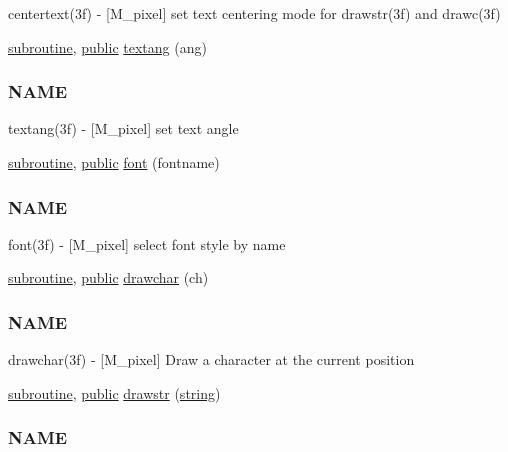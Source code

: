 \begin{DoxyCompactItemize}
\begin{DoxyCompactList}
centertext(3f) -\/ \mbox{[}M\+\_\+pixel\mbox{]} set text centering mode for drawstr(3f) and drawc(3f) \end{DoxyCompactList}\item 
\hyperlink{M__stopwatch_83_8txt_acfbcff50169d691ff02d4a123ed70482}{subroutine}, \hyperlink{M__stopwatch_83_8txt_a2f74811300c361e53b430611a7d1769f}{public} \hyperlink{namespacem__pixel_a5e213461e9894b99c9e8f278d5c4a858}{textang} (ang)
\begin{DoxyCompactList}\small\item\em \subsubsection*{N\+A\+ME}

textang(3f) -\/ \mbox{[}M\+\_\+pixel\mbox{]} set text angle \end{DoxyCompactList}\item 
\hyperlink{M__stopwatch_83_8txt_acfbcff50169d691ff02d4a123ed70482}{subroutine}, \hyperlink{M__stopwatch_83_8txt_a2f74811300c361e53b430611a7d1769f}{public} \hyperlink{namespacem__pixel_a566adb827a3a26ba42d4e86e4c6e12af}{font} (fontname)
\begin{DoxyCompactList}\small\item\em \subsubsection*{N\+A\+ME}

font(3f) -\/ \mbox{[}M\+\_\+pixel\mbox{]} select font style by name \end{DoxyCompactList}\item 
\hyperlink{M__stopwatch_83_8txt_acfbcff50169d691ff02d4a123ed70482}{subroutine}, \hyperlink{M__stopwatch_83_8txt_a2f74811300c361e53b430611a7d1769f}{public} \hyperlink{namespacem__pixel_a58406ffd6c2a9fdf2ea7772198b54255}{drawchar} (ch)
\begin{DoxyCompactList}\small\item\em \subsubsection*{N\+A\+ME}

drawchar(3f) -\/ \mbox{[}M\+\_\+pixel\mbox{]} Draw a character at the current position \end{DoxyCompactList}\item 
\hyperlink{M__stopwatch_83_8txt_acfbcff50169d691ff02d4a123ed70482}{subroutine}, \hyperlink{M__stopwatch_83_8txt_a2f74811300c361e53b430611a7d1769f}{public} \hyperlink{namespacem__pixel_a6fa0c2d531d1ac74840aa2f0e2b050e0}{drawstr} (\hyperlink{what__overview_81_8txt_a74cb7e955273b9f9157b4f0c18a38849}{string})
\begin{DoxyCompactList}\small\item\em \subsubsection*{N\+A\+ME}


\end{DoxyCompactList}
\end{DoxyCompactItemize}
